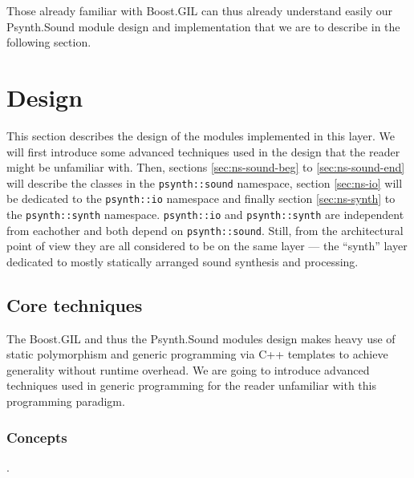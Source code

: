 Those already familiar with Boost.GIL can thus already understand
easily our Psynth.Sound module design and implementation that we are
to describe in the following section.

\section{Design}

This section describes the design of the modules implemented in this
layer. We will first introduce some advanced techniques used in the
design that the reader might be unfamiliar with. Then, sections
\ref{sec:ns-sound-beg} to \ref{sec:ns-sound-end} will describe the
classes in the \texttt{psynth::sound} namespace, section
\ref{sec:ns-io} will be dedicated to the \texttt{psynth::io} namespace
and finally section \ref{sec:ns-synth} to the \texttt{psynth::synth}
namespace. \texttt{psynth::io} and \texttt{psynth::synth} are
independent from eachother and both depend on
\texttt{psynth::sound}. Still, from the architectural point of view
they are all considered to be on the same layer --- the ``synth''
layer dedicated to mostly statically arranged sound synthesis and
processing.

\subsection{Core techniques}

The Boost.GIL and thus the Psynth.Sound modules design makes heavy use
of static polymorphism and generic programming via C++ templates to
achieve generality without runtime overhead. We are going to introduce
advanced techniques used in generic programming for the reader
unfamiliar with this programming paradigm.

\subsubsection{Concepts}
\label{sec:concepts}.

